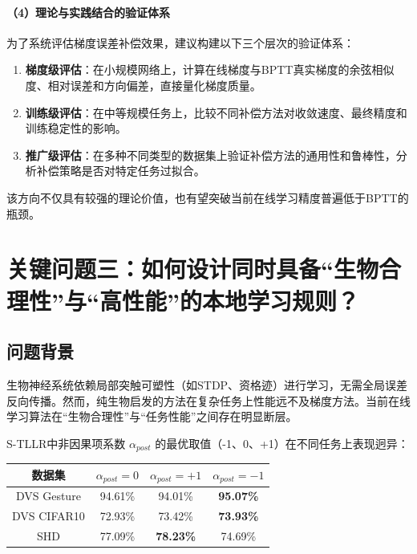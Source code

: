 \documentclass[journal,12pt,onecolumn]{IEEEtran}
\begin{document}
\paragraph{（4）理论与实践结合的验证体系}

为了系统评估梯度误差补偿效果，建议构建以下三个层次的验证体系：

\begin{enumerate}
    \item \textbf{梯度级评估}：在小规模网络上，计算在线梯度与BPTT真实梯度的余弦相似度、相对误差和方向偏差，直接量化梯度质量。
    \item \textbf{训练级评估}：在中等规模任务上，比较不同补偿方法对收敛速度、最终精度和训练稳定性的影响。
    \item \textbf{推广级评估}：在多种不同类型的数据集上验证补偿方法的通用性和鲁棒性，分析补偿策略是否对特定任务过拟合。
\end{enumerate}

该方向不仅具有较强的理论价值，也有望突破当前在线学习精度普遍低于BPTT的瓶颈。

\section{关键问题三：如何设计同时具备“生物合理性”与“高性能”的本地学习规则？}

\subsection{问题背景}

生物神经系统依赖局部突触可塑性（如STDP、资格迹）进行学习，无需全局误差反向传播。然而，纯生物启发的方法在复杂任务上性能远不及梯度方法。当前在线学习算法在“生物合理性”与“任务性能”之间存在明显断层。

S-TLLR中非因果项系数 \(\alpha_{post}\) 的最优取值（-1、0、+1）在不同任务上表现迥异：

\begin{center}
\begin{tabular}{c|c|c|c}
\hline
数据集 & \(\alpha_{post}=0\) & \(\alpha_{post}=+1\) & \(\alpha_{post}=-1\) \\
\hline
DVS Gesture & 94.61\% & 94.01\% & \textbf{95.07\%} \\
DVS CIFAR10 & 72.93\% & 73.42\% & \textbf{73.93\%} \\
SHD & 77.09\% & \textbf{78.23\%} & 74.69\% \\
\hline
\end{tabular}
\end{center}
\end{document}
